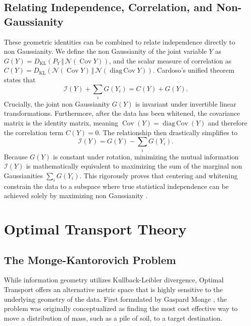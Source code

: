 \documentclass[12pt,a4paper,twoside,openany]{book}
\begin{document}
\subsection{Relating Independence, Correlation, and Non-Gaussianity}
These geometric identities can be combined to relate independence directly to non Gaussianity. We define the non Gaussianity of the joint variable $Y$ as $G(Y) = D_{\mathrm{KL}}(P_Y \,\Vert\, \mathcal{N}(\operatorname{Cov} Y))$, and the scalar measure of correlation as $C(Y) = D_{\mathrm{KL}}(\mathcal{N}(\operatorname{Cov} Y) \,\Vert\, \mathcal{N}(\operatorname{diag\,Cov} Y))$. Cardoso's unified theorem states that
\begin{equation}
    \mathscr{I}(Y) + \sum_{i} G(Y_i) = C(Y) + G(Y).
\end{equation}
Crucially, the joint non Gaussianity $G(Y)$ is invariant under invertible linear transformations. Furthermore, after the data has been whitened, 
the covariance matrix is the identity matrix, meaning $\operatorname{Cov}(Y) = \operatorname{diag\,Cov}(Y)$ and therefore the correlation term $C(Y) = 0$. 
The relationship then drastically simplifies to
\begin{equation}
    \mathscr{I}(Y) = G(Y) - \sum_{i} G(Y_i).
\end{equation}
Because $G(Y)$ is constant under rotation, minimizing the mutual information $\mathscr{I}(Y)$ is mathematically equivalent to maximizing the sum of the 
marginal non Gaussianities $\sum_i G(Y_i)$. This rigorously proves that centering and whitening constrain the data to a subspace where true statistical independence can be 
achieved solely by maximizing non Gaussianity \cite{cardoso2022}.

\section{Optimal Transport Theory}

\subsection{The Monge-Kantorovich Problem}
While information geometry utilizes Kullback-Leibler divergence, Optimal Transport offers an alternative metric space that is highly sensitive to the underlying geometry of the data. 
First formulated by Gaspard Monge \citeyear{monge1781}, the problem was originally conceptualized as finding the most cost effective way to move a distribution of mass, such as a pile of soil, 
to a target destination. 
\end{document}
